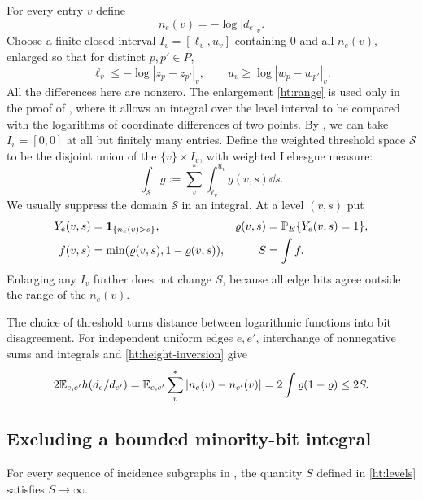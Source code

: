 For every entry $v$ define
\[
 n_e(v)=-\log|d_e|_v.
\]
Choose a finite closed interval $I_v=[\ell_v,u_v]$ containing $0$ and all
$n_e(v)$, enlarged so that for distinct $p,p'\in P$,
\begin{equation}\label{ht:range}
 \ell_v\le-\log|z_p-z_{p'}|_v,\qquad
 u_v\ge\log|w_p-w_{p'}|_v.
\end{equation}
All the differences here are nonzero. The enlargement \eqref{ht:range} is
used only in the proof of , where it allows an
integral over the level interval to be compared with the logarithms of
coordinate differences of two points. By , we can take
$I_v=[0,0]$ at all but finitely many entries. Define the weighted threshold space
$\mathcal S$ to be the disjoint union of the $\{v\}\times I_v$, with
weighted Lebesgue measure:
\[
 \int_{\mathcal S}g
   :=\sum_v^*\int_{\ell_v}^{u_v}g(v,s)\dd s.
\]
We usually suppress the domain $\mathcal S$ in an integral.
At a level $(v,s)$ put
\begin{equation}\label{ht:levels}
 \begin{aligned}
 Y_e(v,s)&=\mathbf1_{\{n_e(v)>s\}},&
 \varrho(v,s)&=\mathbb P_E\{Y_e(v,s)=1\},\\
 f(v,s)&=\min(\varrho(v,s),1-\varrho(v,s)),& S&=\int f.
 \end{aligned}
\end{equation}
Enlarging any $I_v$ further does not change $S$, because all edge bits
agree outside the range of the $n_e(v)$.

The choice of threshold turns distance between logarithmic functions into
bit disagreement. For independent uniform edges $e,e'$, interchange of nonnegative sums and integrals
and \eqref{ht:height-inversion} give
\begin{equation}\label{ht:independent-profiles}
 2\mathbb E_{e,e'}h(d_e/d_{e'})
 =\mathbb E_{e,e'}\sum_v^*|n_e(v)-n_{e'}(v)|
 =2\int\varrho(1-\varrho)\le2S.
\end{equation}

\subsection{Excluding a bounded minority-bit integral}\label{sec:bounded-proof}

\begin{proposition}\label{ht:bounded}
For every sequence of incidence subgraphs in , the
quantity $S$ defined in \eqref{ht:levels} satisfies $S\to\infty$.
\end{proposition}

